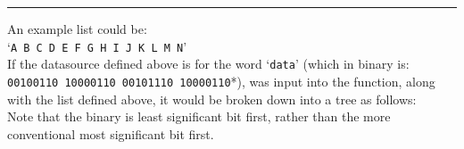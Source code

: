 \hrule
\newpage
An example list could be:\\
`\texttt{A B C D E F G H I J K L M N}'\\
If the datasource defined above is for the word `\texttt{data}' (which in binary is:
\texttt{00100110 10000110 00101110 10000110}*), was input into the function, along with the list defined above, it would be broken down into a tree as follows:\\
{\small *Note that the binary is least significant bit first, rather than the more conventional most significant bit first.}



